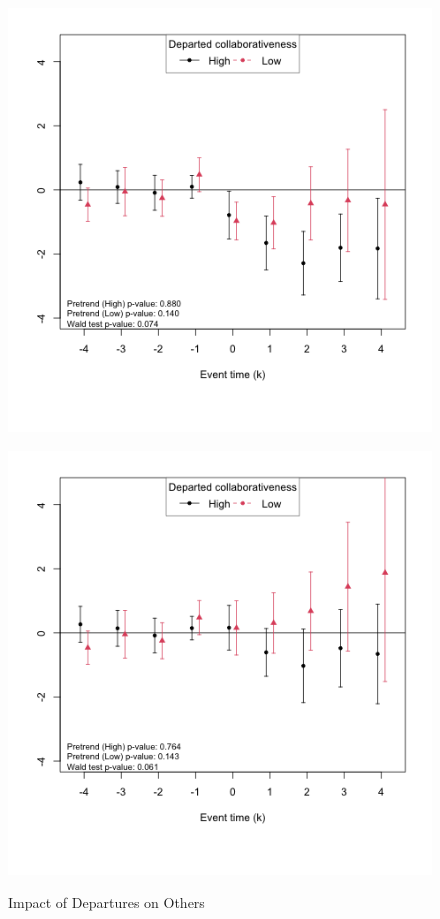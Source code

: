 \begin{figure}[htbp]
    \caption{Impact of Departures on Others}
    \label{fig:prs_opened_other_contr}
    \centering
    \begin{minipage}[b]{0.49\textwidth}
        \centering
         \label{fig:predep_prs_opened_collab}
        \includegraphics[width=\textwidth]{temp/output/collab/cs_norm_prs_opened_predep.png}
    \end{minipage}
    \hfill
    \begin{minipage}[b]{0.49\textwidth}
        \centering
         \label{fig:nondep_prs_opened_collab}
        \includegraphics[width=\textwidth]{temp/output/collab/cs_norm_prs_opened_nondep.png}
    \end{minipage}


\end{figure}

